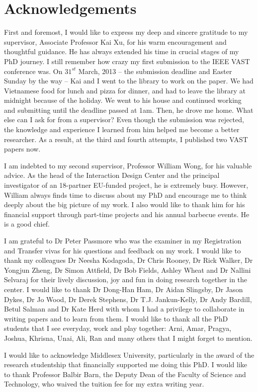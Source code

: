 \section*{Acknowledgements}
First and foremost, I would like to express my deep and sincere gratitude to my supervisor, Associate Professor Kai Xu, for his warm encouragement and thoughtful guidance. He has always extended his time in crucial stages of my PhD journey. I still remember how crazy my first submission to the IEEE VAST conference was. On $31^{st}$ March, 2013 -- the submission deadline and Easter Sunday by the way -- Kai and I went to the library to work on the paper. We had Vietnamese food for lunch and pizza for dinner, and had to leave the library at midnight because of the holiday. We went to his house and continued working and submitting until the deadline passed at 1am. Then, he drove me home. What else can I ask for from a supervisor? Even though the submission was rejected, the knowledge and experience I learned from him helped me become a better researcher. As a result, at the third and fourth attempts, I published two VAST papers now.

I am indebted to my second supervisor, Professor William Wong, for his valuable advice. As the head of the Interaction Design Center and the principal investigator of an 18-partner EU-funded project, he is extremely busy. However, William always finds time to discuss about my PhD and encourage me to think deeply about the big picture of my work. I also would like to thank him for his financial support through part-time projects and his annual barbecue events. He is a good chief.

I am grateful to Dr Peter Passmore who was the examiner in my Registration and Transfer vivas for his questions and feedback on my work. I would like to thank my colleagues Dr Neesha Kodagoda, Dr Chris Rooney, Dr Rick Walker, Dr Yongjun Zheng, Dr Simon Attfield, Dr Bob Fields, Ashley Wheat and Dr Nallini Selvaraj for their lively discussion, joy and fun in doing research together in the center. I would like to thank Dr Dong-Han Ham, Dr Aidan Slingsby, Dr Jason Dykes, Dr Jo Wood, Dr Derek Stephens, Dr T.J. Jankun-Kelly, Dr Andy Bardill,  Betul Salman and Dr Kate Herd with whom I had a privilege to collaborate in writing papers and to learn from them. I would like to thank all the PhD students that I see everyday, work and play together: Arni, Amar, Pragya, Joshua, Khrisna, Unai, Ali, Ran and many others that I might forget to mention.

I would like to acknowledge Middlesex University, particularly in the award of the research studentship that financially supported me doing this PhD. I would like to thank Professor Balbir Barn, the Deputy Dean of the Faculty of Science and Technology, who waived the tuition fee for my extra writing year.

